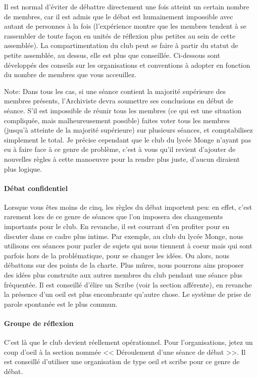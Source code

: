 \documentclass[a4paper,12pt]{article}
\begin{document}
Il est normal d'éviter de débattre directement une fois atteint un certain nombre de membres, car il est admis que le débat est humainement impossible avec autant de personnes à la fois (l'expérience montre que les membres tendent à se rassembler de toute façon en unités de réflexion plus petites au sein de cette assemblée). La compartimentation du club peut se faire à partir du statut de petite assemblée, au dessus, elle est plus que conseillée. Ci-dessous sont développés des conseils sur les organisations et conventions à adopter en fonction du nombre de membres que vous acceuillez.

Note: Dans tous les cas, si une séance contient la majorité supérieure des membres présents, l'Archiviste devra soumettre ses conclusions en début de séance. S'il est impossible de réunir tous les membres (ce qui est une situation compliquée, mais malheureusement possible) faites voter tous les membres (jusqu'à atteinte de la majorité supérieure) sur plusieurs séances, et comptabilisez simplement le total. Je précise cependant que le club du lycée Monge n'ayant pas eu à faire face à ce genre de problème, c'est à vous qu'il revient d'ajouter de nouvelles règles à cette manoeuvre pour la rendre plus juste, d'aucun diraient plus logique.

\paragraph{Débat confidentiel}
Lorsque vous êtes moins de cinq, les règles du débat importent peu: en effet, c'est rarement lors de ce genre de séances que l'on imposera des changements importants pour le club. En revanche, il est courrant d'en profiter pour en discuter dans ce cadre plus intime. Par exemple, au club du lycée Monge, nous utilisons ces séances pour parler de sujets qui nous tiennent à coeur mais qui sont parfois hors de la problématique, pour se changer les idées. Ou alors, nous débattons sur des points de la charte. Plus mûres, nous pourrons ains proposer des idées plus construite aux autres membres du club pendant une séance plus fréquentée. Il est conseillé d'élire un Scribe (voir la section afférente), en revanche la présence d'un oeil est plus encombrante qu'autre chose. Le système de prise de parole spontanée est le plus commun.

\paragraph{Groupe de réflexion}
C'est là que le club devient réellement opérationnel. Pour l'organisations, jetez un coup d'oeil à la section nommée << Déroulement d'une séance de débat >>. Il est conseillé d'utiliser une organisation de type oeil et scribe pour ce genre de débat. 
\end{document}
